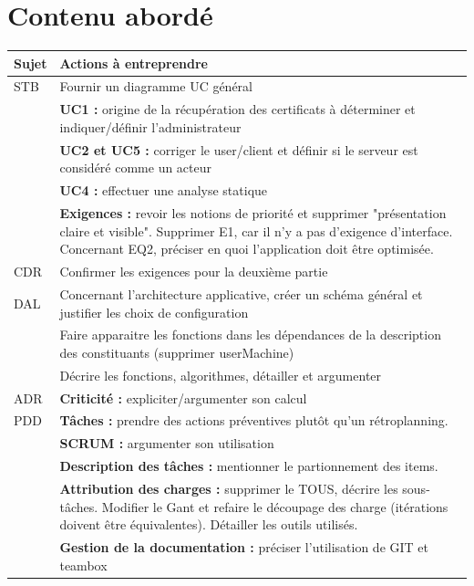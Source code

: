 \documentclass[a4paper,11pt,french]{article}
\begin{document}
\section{Contenu abordé}
\begin{center}

\begin{tabular}{ | l | p{15cm} |}
	\hline
   \textbf{Sujet} & \textbf{Actions à entreprendre}    \\ \hline
 STB & Fournir un diagramme UC général \\ 
 & \textbf{UC1 :} origine de la récupération des certificats à déterminer et indiquer/définir l'administrateur \\
 & \textbf{UC2 et UC5 :} corriger le user/client et définir si le serveur est considéré comme un acteur \\ 
 & \textbf{UC4 :} effectuer une analyse statique \\ 
 & \textbf{Exigences :} revoir les notions de priorité et supprimer "présentation claire et visible". Supprimer E1, car il n'y a pas d'exigence d'interface. Concernant EQ2, préciser en quoi l'application doit être optimisée. \\ \hline
CDR &  Confirmer les exigences pour la deuxième partie \\ \hline
DAL & Concernant l'architecture applicative, créer un schéma général et justifier les choix de configuration\\
	& Faire apparaitre les fonctions dans les dépendances de la description des constituants (supprimer userMachine)\\
	& Décrire les fonctions, algorithmes, détailler et argumenter\\ \hline
ADR	& \textbf{Criticité :} expliciter/argumenter son calcul \\ \hline
PDD & \textbf{Tâches :}  prendre des actions préventives plutôt qu'un rétroplanning.\\
 & \textbf{SCRUM :}  argumenter son utilisation\\
 & \textbf{Description des tâches :} mentionner le partionnement des items. \\
 & \textbf{Attribution des charges :} supprimer le TOUS, décrire les sous-tâches. Modifier le Gant et refaire le découpage des charge (itérations doivent être équivalentes). Détailler les outils utilisés. \\
 & \textbf{Gestion de la documentation :} préciser l'utilisation de GIT et teambox\\ \hline
 \end{tabular}
 
\end{center}
\end{document}
